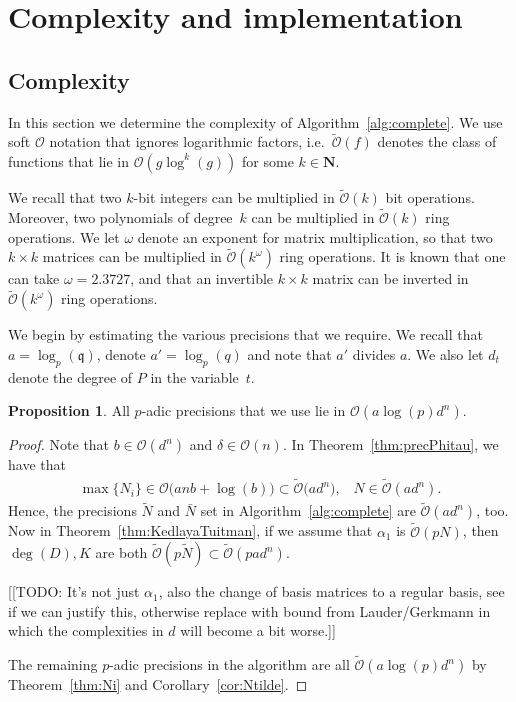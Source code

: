 \documentclass[a4paper,11pt]{article}
\numberwithin{equation}{section}
\newcommand{\NN}{\mathbf{N}} %
\providecommand{\BigOh}{\mathcal{O}}          %
\providecommand{\SoftOh}{\tilde{\mathcal{O}}} %
\theoremstyle{definition}
\newtheorem{prop}[thm]{Proposition}
\begin{document}

\section{Complexity and implementation}

\subsection{Complexity}

In this section we determine the complexity of Algorithm~\ref{alg:complete}.  
We use soft $\mathcal{O}$ notation that ignores logarithmic factors, i.e.\ 
$\SoftOh(f)$ denotes the class of functions that lie in $\BigOh(g \log^k(g))$ 
for some $k \in \NN$.

We recall that two $k$-bit integers can be multiplied in $\SoftOh(k)$ 
bit operations.  Moreover, two polynomials of degree~$k$ can be multiplied 
in $\SoftOh(k)$ ring operations.  We let $\omega$ denote an exponent for 
matrix multiplication, so that two $k \times k$ matrices can be multiplied 
in $\SoftOh(k^{\omega})$ ring operations.  It is known that one can take 
$\omega = 2.3727$, and that an invertible $k \times k$ matrix can be inverted 
in $\SoftOh(k^{\omega})$ ring operations.

We begin by estimating the various precisions that we require.  We recall 
that $a = \log_p(\mathfrak{q})$, denote $a' = \log_p(q)$ and note that 
$a'$ divides $a$.  We also let $d_t$ denote the degree of $P$ in the 
variable~$t$.

\begin{prop}
All $p$-adic precisions that we use lie in $\BigOh(a\log(p)d^n)$.
\end{prop}

\begin{proof}
Note that $b \in \BigOh(d^n)$ and $\delta \in \BigOh(n)$.  
In Theorem~\ref{thm:precPhitau}, we have that
\begin{eqnarray*}
\max\{N_i\} \in \BigOh\bigl(a n b + \log(b) \bigr) 
            \subset \SoftOh\bigl(a d^n \bigr), \;\;\;
N           \in \SoftOh(a d^n).
\end{eqnarray*}
Hence, the precisions $\tilde{N}$ and $\bar{N}$ set in 
Algorithm~\ref{alg:complete} are $\SoftOh(ad^n)$, too. 
Now in Theorem~\ref{thm:KedlayaTuitman}, if we assume that 
$\alpha_1$ is $\SoftOh(pN)$, then $\deg(D), K$ are both 
$\SoftOh(p\tilde{N}) \subset \SoftOh(p a d^n)$.

[[TODO: It's not just $\alpha_1$, also the change of basis matrices to 
a regular basis, see if we can justify this, otherwise replace with bound 
from Lauder/Gerkmann in which the complexities in $d$ will become a bit 
worse.]]

The remaining $p$-adic precisions in the algorithm are all 
$\SoftOh(a\log(p)d^n)$ by Theorem~\ref{thm:Ni} and Corollary~\ref{cor:Ntilde}.
\end{proof}
\end{document}
